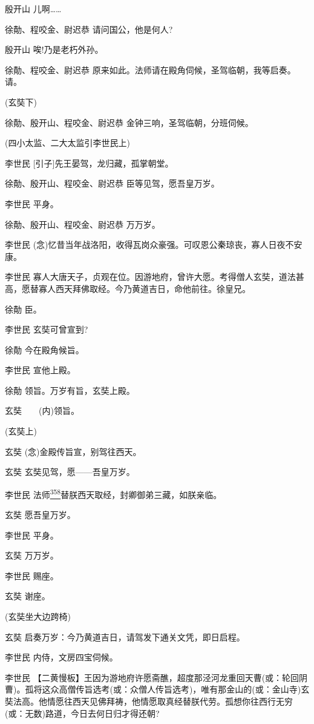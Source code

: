 殷开山 儿啊\ldots{}\ldots{}

徐勣、程咬金、尉迟恭 请问国公，他是何人?

殷开山 唉!乃是老朽外孙。

徐勣、程咬金、尉迟恭
原来如此。法师请在殿角伺候，圣驾临朝，我等启奏。请。

(玄奘下)

徐勣、殷开山、程咬金、尉迟恭 金钟三响，圣驾临朝，分班伺候。

(四小太监、二大太监引李世民上)

李世民 {[}引子{]}先王晏驾，龙归藏，孤掌朝堂。

徐勣、殷开山、程咬金、尉迟恭 臣等见驾，愿吾皇万岁。

李世民 平身。

徐勣、殷开山、程咬金、尉迟恭 万万岁。

李世民
(念)忆昔当年战洛阳，收得瓦岗众豪强。可叹恩公秦琼丧，寡人日夜不安康。

李世民
寡人大唐天子，贞观在位。因游地府，曾许大愿。考得僧人玄奘，道法甚高，愿替寡人西天拜佛取经。今乃黄道吉日，命他前往。徐皇兄。

徐勣 臣。

李世民 玄奘可曾宣到?

徐勣 今在殿角候旨。

李世民 宣他上殿。

徐勣 领旨。万岁有旨，玄奘上殿。

玄奘　　(内)领旨。

(玄奘上)

玄奘 (念)金殿传旨宣，别驾往西天。

玄奘 玄奘见驾，愿------吾皇万岁。

李世民
法师\protect\hyperlink{fn358}{\textsuperscript{358}}替朕西天取经，封卿御弟三藏，如朕亲临。

玄奘 愿吾皇万岁。

李世民 平身。

玄奘 万万岁。

李世民 赐座。

玄奘 谢座。

(玄奘坐大边跨椅)

玄奘 启奏万岁：今乃黄道吉日，请驾发下通关文凭，即日启程。

李世民 内侍，文房四宝伺候。

李世民
【二黄慢板】王因为游地府许愿斋醮，超度那泾河龙重回天曹(或：轮回阴曹)。孤将这众高僧传旨选考(或：众僧人传旨选考)，唯有那金山的(或：金山寺)玄奘法高。他情愿往西天见佛拜祷，他情愿取真经替朕代劳。孤想你往西行无穷(或：无数)路道，今日去何日归才得还朝?

